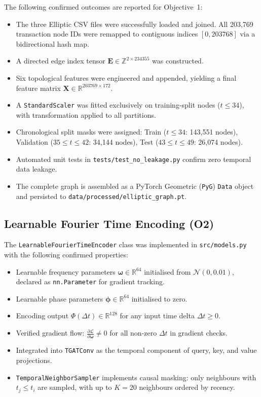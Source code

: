 The following confirmed outcomes are reported for Objective~1:
\begin{itemize}
    \item The three Elliptic CSV files were successfully loaded and joined. All 203,769 transaction node IDs were remapped to contiguous indices $[0, 203768]$ via a bidirectional hash map.
    \item A directed edge index tensor $\mathbf{E} \in \mathbb{Z}^{2 \times 234355}$ was constructed.
    \item Six topological features were engineered and appended, yielding a final feature matrix $\mathbf{X} \in \mathbb{R}^{203769 \times 172}$.
    \item A \texttt{StandardScaler} was fitted exclusively on training-split nodes ($t \leq 34$), with transformation applied to all partitions.
    \item Chronological split masks were assigned: Train ($t \leq 34$: 143,551 nodes), Validation ($35 \leq t \leq 42$: 34,144 nodes), Test ($43 \leq t \leq 49$: 26,074 nodes).
    \item Automated unit tests in \texttt{tests/test\_no\_leakage.py} confirm zero temporal data leakage.
    \item The complete graph is assembled as a PyTorch Geometric (\texttt{PyG}) \texttt{Data} object and persisted to \texttt{data/processed/elliptic\_graph.pt}.
\end{itemize}

\subsection{Learnable Fourier Time Encoding (O2)}

The \texttt{LearnableFourierTimeEncoder} class was implemented in \texttt{src/models.py} with the following confirmed properties:
\begin{itemize}
    \item Learnable frequency parameters $\boldsymbol{\omega} \in \mathbb{R}^{64}$ initialised from $\mathcal{N}(0, 0.01)$, declared as \texttt{nn.Parameter} for gradient tracking.
    \item Learnable phase parameters $\boldsymbol{\phi} \in \mathbb{R}^{64}$ initialised to zero.
    \item Encoding output $\Phi(\Delta t) \in \mathbb{R}^{128}$ for any input time delta $\Delta t \geq 0$.
    \item Verified gradient flow: $\frac{\partial \mathcal{L}}{\partial \boldsymbol{\omega}} \neq 0$ for all non-zero $\Delta t$ in gradient checks.
    \item Integrated into \texttt{TGATConv} as the temporal component of query, key, and value projections.
    \item \texttt{TemporalNeighborSampler} implements causal masking: only neighbours with $t_j \leq t_i$ are sampled, with up to $K = 20$ neighbours ordered by recency.
\end{itemize}

